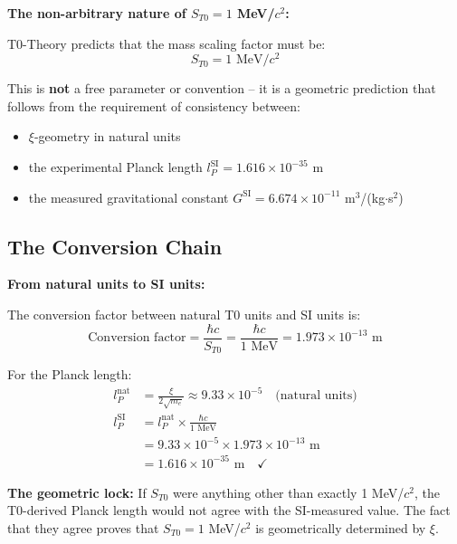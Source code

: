 \documentclass[12pt,a4paper]{article}
\begin{document}
	\begin{keyresult}
		\textbf{The non-arbitrary nature of $S_{T0} = 1$ MeV/$c^2$:}
		
		T0-Theory predicts that the mass scaling factor must be:
		\begin{equation}
			\boxed{S_{T0} = 1 \text{ MeV}/c^2}
		\end{equation}
		
		This is \textbf{not} a free parameter or convention -- it is a geometric prediction that follows from the requirement of consistency between:
		\begin{itemize}
			\item $\xi$-geometry in natural units
			\item the experimental Planck length $l_P^{\text{SI}} = 1.616 \times 10^{-35}$ m
			\item the measured gravitational constant $G^{\text{SI}} = 6.674 \times 10^{-11}$ m$^3$/(kg$\cdot$s$^2$)
		\end{itemize}
	\end{keyresult}
	
	\subsection{The Conversion Chain}
	
	\begin{derivation}
		\textbf{From natural units to SI units:}
		
		The conversion factor between natural T0 units and SI units is:
		\begin{equation}
			\text{Conversion factor} = \frac{\hbar c}{S_{T0}} = \frac{\hbar c}{1 \text{ MeV}} = 1.973 \times 10^{-13} \text{ m}
		\end{equation}
		
		For the Planck length:
		\begin{align}
			l_P^{\text{nat}} &= \frac{\xi}{2\sqrt{m_e}} \approx 9.33 \times 10^{-5} \quad \text{(natural units)} \\
			l_P^{\text{SI}} &= l_P^{\text{nat}} \times \frac{\hbar c}{1 \text{ MeV}} \\
			&= 9.33 \times 10^{-5} \times 1.973 \times 10^{-13} \text{ m} \\
			&= 1.616 \times 10^{-35} \text{ m} \quad \checkmark
		\end{align}
		
		\textbf{The geometric lock:} If $S_{T0}$ were anything other than exactly 1 MeV/$c^2$, the T0-derived Planck length would not agree with the SI-measured value. The fact that they agree proves that $S_{T0} = 1$ MeV/$c^2$ is geometrically determined by $\xi$.
	\end{derivation}
	
\end{document}
